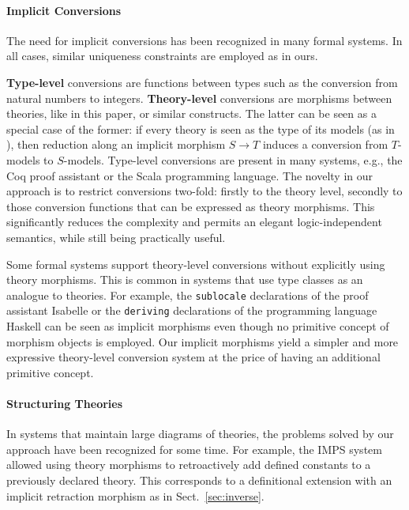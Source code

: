 \paragraph{Implicit Conversions}
The need for implicit conversions has been recognized in many formal systems.
In all cases, similar uniqueness constraints are employed as in ours.

\textbf{Type-level} conversions are functions between types such as the conversion from natural numbers to integers.
\textbf{Theory-level} conversions are morphisms between theories, like in this paper, or similar constructs.
The latter can be seen as a special case of the former: if every theory is seen as the type of its models (as in \cite{MRK:modelsof:18}), then reduction along an implicit morphism $S\to T$ induces a conversion from $T$-models to $S$-models.
Type-level conversions are present in many systems, e.g., the Coq proof assistant \cite{coq} or the Scala programming language.
The novelty in our approach is to restrict conversions two-fold: firstly to the theory level, secondly to those conversion functions that can be expressed as theory morphisms.
This significantly reduces the complexity and permits an elegant logic-independent semantics, while still being practically useful.

Some formal systems support theory-level conversions without explicitly using theory morphisms.
This is common in systems that use type classes as an analogue to theories.
For example, the \texttt{sublocale} declarations of the proof assistant Isabelle \cite{isabelle_locales} or the \texttt{deriving} declarations of the programming language Haskell can be seen as implicit morphisms even though no primitive concept of morphism objects is employed.
Our implicit morphisms yield a simpler and more expressive theory-level conversion system at the price of having an additional primitive concept.

\paragraph{Structuring Theories}
In systems that maintain large diagrams of theories, the problems solved by our approach have been recognized for some time.
For example, the IMPS system \cite{imps} allowed using theory morphisms to retroactively add defined constants to a previously declared theory.
This corresponds to a definitional extension with an implicit retraction morphism as in Sect.~\ref{sec:inverse}.

